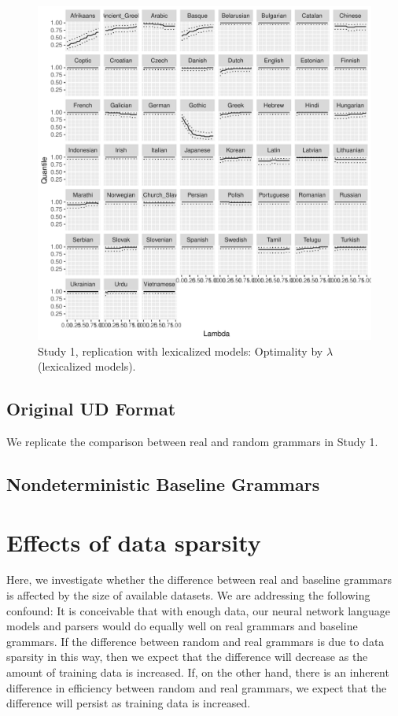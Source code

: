 \documentclass[10pt,twoside,lineno]{article}
\begin{document}
\begin{figure}
	\centering
	\includegraphics[width=\textwidth]{../results/plane/unlexicalized/analyze_pareto_optimality/figures/quantileByLambda-mle.pdf}
	\caption{Study 1, replication with lexicalized models: Optimality by $\lambda$ (lexicalized models).}
\end{figure}


\subsection{Original UD Format}

We replicate the comparison between real and random grammars in Study 1.



\subsection{Nondeterministic Baseline Grammars}





\section{Effects of data sparsity}

Here, we investigate whether the difference between real and baseline grammars is affected by the size of available datasets.
We are addressing the following confound: It is conceivable that with enough data, our neural network language models and parsers would do equally well on real grammars and baseline grammars.
If the difference between random and real grammars is due to data sparsity in this way, then we expect that the difference will decrease as the amount of training data is increased.
If, on the other hand, there is an inherent difference in efficiency between random and real grammars, we expect that the difference will persist as training data is increased.
\end{document}

